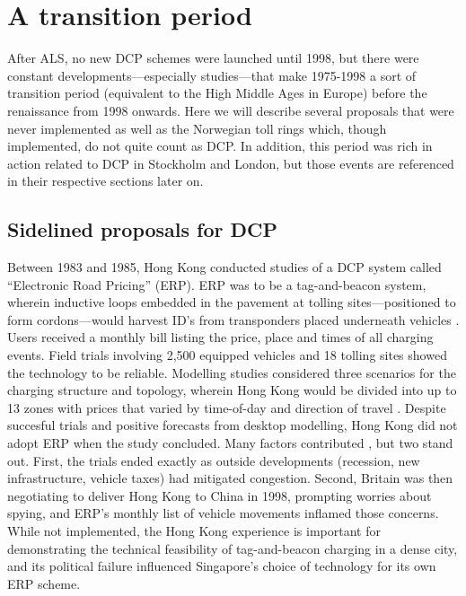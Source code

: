 \section{A transition period}\label{sec:transition}

After ALS, no new DCP schemes were launched until 1998, but there were constant developments---especially studies---that make 1975-1998 a sort of transition period (equivalent to the High Middle Ages in Europe) before the renaissance from 1998 onwards. Here we will describe several proposals that were never implemented as well as the Norwegian toll rings which, though implemented, do not quite count as DCP. In addition, this period was rich in action related to DCP in Stockholm and London, but those events are referenced in their respective sections later on.

\subsection{Sidelined proposals for DCP}

 Between 1983 and 1985, Hong Kong conducted studies of a DCP system called ``Electronic Road Pricing'' (ERP). ERP was to be a tag-and-beacon system, wherein inductive loops embedded in the pavement at tolling sites---positioned to form cordons---would harvest ID's from transponders placed underneath vehicles \citep{Dawson1986}. Users received a monthly bill listing the price, place and times of all charging events. Field trials involving 2,500 equipped vehicles and 18 tolling sites showed the technology to be reliable. Modelling studies considered three scenarios for the charging structure and topology, wherein Hong Kong would be divided into up to 13 zones with prices that varied by time-of-day and direction of travel \citep[Table 11, p. 23]{Gomez-Ibanez1994}.  Despite succesful trials and positive forecasts from desktop modelling, Hong Kong did not adopt ERP when the study concluded. Many factors contributed \citep{Hau1990,Borins1988}, but two stand out. First, the trials ended exactly as outside developments (recession, new infrastructure, vehicle taxes) had mitigated congestion. Second, Britain was then negotiating to deliver Hong Kong to China in 1998, prompting worries about spying, and  ERP's monthly list of vehicle movements inflamed those concerns. While not implemented, the Hong Kong experience is important for demonstrating the technical feasibility of tag-and-beacon charging in a dense city, and its political failure influenced Singapore's choice of technology for its own ERP scheme.

